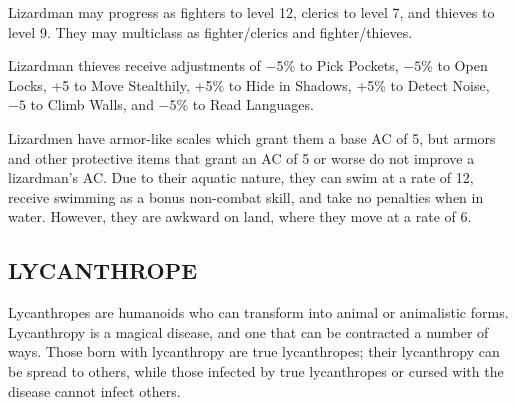 \begin{multicols}{2}
\begin{minipage}{\columnwidth}
\end{minipage}

Lizardman may progress as fighters to level 12, clerics to level 7, and thieves to level 9. They may multiclass as fighter/clerics and fighter/thieves.

Lizardman thieves receive adjustments of $-5$\% to Pick Pockets, $-5$\% to Open Locks, +5 to Move Stealthily, +5\% to Hide in Shadows, +5\% to Detect Noise, $-5$ to Climb Walls, and $-5$\% to Read Languages.

Lizardmen have armor-like scales which grant them a base AC of 5, but armors and other protective items that grant an AC of 5 or worse do not improve a lizardman's AC. Due to their aquatic nature, they can swim at a rate of 12, receive swimming as a bonus non-combat skill, and take no penalties when in water. However, they are awkward on land, where they move at a rate of 6.

\subsection{LYCANTHROPE}

Lycanthropes are humanoids who can transform into animal or animalistic forms. Lycanthropy is a magical disease, and one that can be contracted a number of ways. Those born with lycanthropy are true lycanthropes; their lycanthropy can be spread to others, while those infected by true lycanthropes or cursed with the disease cannot infect others.

\end{multicols}

